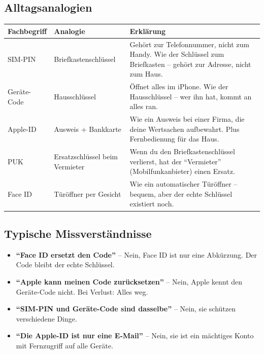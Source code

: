 \documentclass[11pt,a4paper]{article}
\begin{document}
\subsection{Alltagsanalogien}

\begin{tabular}{|l|l|p{6cm}|}
\hline
\textbf{Fachbegriff} & \textbf{Analogie} & \textbf{Erklärung} \\
\hline
\textcolor{simblue}{SIM-PIN} & Briefkastenschlüssel & Gehört zur Telefonnummer, nicht zum Handy. Wie der Schlüssel zum Briefkasten -- gehört zur Adresse, nicht zum Haus. \\
\hline
\textcolor{devicegreen}{Geräte-Code} & Hausschlüssel & Öffnet alles im iPhone. Wie der Hausschlüssel -- wer ihn hat, kommt an alles ran. \\
\hline
\textcolor{applered}{Apple-ID} & Ausweis + Bankkarte & Wie ein Ausweis bei einer Firma, die deine Wertsachen aufbewahrt. Plus Fernbedienung für das Haus. \\
\hline
PUK & Ersatzschlüssel beim Vermieter & Wenn du den Briefkastenschlüssel verlierst, hat der ``Vermieter'' (Mobilfunkanbieter) einen Ersatz. \\
\hline
Face ID & Türöffner per Gesicht & Wie ein automatischer Türöffner -- bequem, aber der echte Schlüssel existiert noch. \\
\hline
\end{tabular}

\subsection{Typische Missverständnisse}

\begin{itemize}
    \item \textbf{``Face ID ersetzt den Code''} -- Nein, Face ID ist nur eine Abkürzung. Der Code bleibt der echte Schlüssel.
    \item \textbf{``Apple kann meinen Code zurücksetzen''} -- Nein, Apple kennt den Geräte-Code nicht. Bei Verlust: Alles weg.
    \item \textbf{``SIM-PIN und Geräte-Code sind dasselbe''} -- Nein, sie schützen verschiedene Dinge.
    \item \textbf{``Die Apple-ID ist nur eine E-Mail''} -- Nein, sie ist ein mächtiges Konto mit Fernzugriff auf alle Geräte.
\end{itemize}

\end{document}
